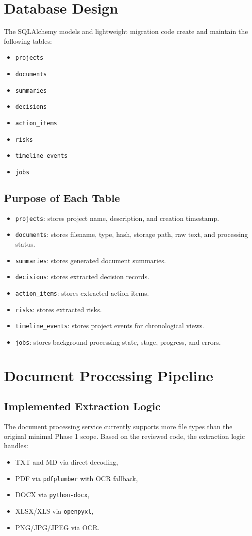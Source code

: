 \documentclass[12pt, a4paper]{article}
\begin{document}
\section{Database Design}
The SQLAlchemy models and lightweight migration code create and maintain the following tables:
\begin{itemize}
\item \texttt{projects}
\item \texttt{documents}
\item \texttt{summaries}
\item \texttt{decisions}
\item \texttt{action\_items}
\item \texttt{risks}
\item \texttt{timeline\_events}
\item \texttt{jobs}
\end{itemize}

\subsection{Purpose of Each Table}
\begin{itemize}
\item \texttt{projects}: stores project name, description, and creation timestamp.
\item \texttt{documents}: stores filename, type, hash, storage path, raw text, and processing status.
\item \texttt{summaries}: stores generated document summaries.
\item \texttt{decisions}: stores extracted decision records.
\item \texttt{action\_items}: stores extracted action items.
\item \texttt{risks}: stores extracted risks.
\item \texttt{timeline\_events}: stores project events for chronological views.
\item \texttt{jobs}: stores background processing state, stage, progress, and errors.
\end{itemize}

\section{Document Processing Pipeline}
\subsection{Implemented Extraction Logic}
The document processing service currently supports more file types than the original minimal Phase 1 scope. Based on the reviewed code, the extraction logic handles:
\begin{itemize}
\item TXT and MD via direct decoding,
\item PDF via \texttt{pdfplumber} with OCR fallback,
\item DOCX via \texttt{python-docx},
\item XLSX/XLS via \texttt{openpyxl},
\item PNG/JPG/JPEG via OCR.
\end{itemize}
\end{document}
